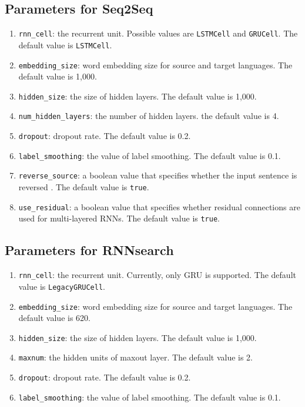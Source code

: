 \documentclass{article}
\begin{document}
\subsection{Parameters for Seq2Seq}

\begin{enumerate}
\item \verb|rnn_cell|: the recurrent unit. Possible values are \verb|LSTMCell| and \verb|GRUCell|. The default value is \verb|LSTMCell|.
\item \verb|embedding_size|: word embedding size for source and target languages. The default value is 1,000.
\item \verb|hidden_size|: the size of hidden layers. The default value is 1,000.
\item \verb|num_hidden_layers|: the number of hidden layers. the default value is 4.
\item \verb|dropout|: dropout rate. The default value is 0.2.
\item \verb|label_smoothing|: the value of label smoothing. The default value is 0.1.
\item \verb|reverse_source|: a boolean value that specifies whether the input sentence is reversed \citep{Sutskever:14}. The default value is \verb|true|.
\item \verb|use_residual|: a boolean value that specifies whether residual connections are used for multi-layered RNNs. The default value is \verb|true|.
\end{enumerate}

\subsection{Parameters for RNNsearch}

\begin{enumerate}
\item \verb|rnn_cell|: the recurrent unit. Currently, only GRU is supported. The default value is \verb|LegacyGRUCell|.
\item \verb|embedding_size|: word embedding size for source and target languages. The default value is 620.
\item \verb|hidden_size|: the size of hidden layers. The default value is 1,000.
\item \verb|maxnum|: the hidden units of maxout layer. The default value is 2.
\item \verb|dropout|: dropout rate. The default value is 0.2.
\item \verb|label_smoothing|: the value of label smoothing. The default value is 0.1.
\end{enumerate}
\end{document}
